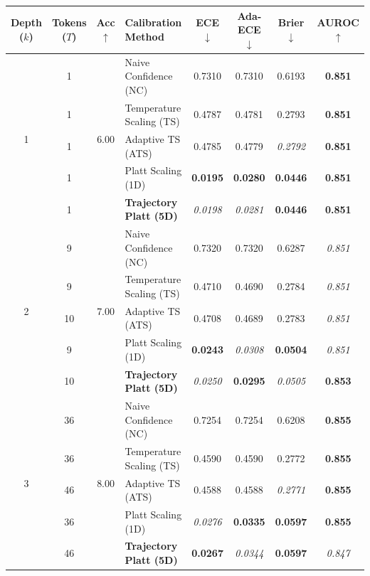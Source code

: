 \begin{table}[t]
\setlength{\tabcolsep}{4pt}
\renewcommand{\arraystretch}{1.05}
\centering
\footnotesize
\begin{tabular}{ccclcccc}
\toprule
\textbf{Depth ($k$)} & \textbf{Tokens ($T$)} & \textbf{Acc} $\uparrow$ & \textbf{Calibration Method} & \textbf{ECE} $\downarrow$ & \textbf{Ada-ECE} $\downarrow$ & \textbf{Brier} $\downarrow$ & \textbf{AUROC} $\uparrow$ \\
\midrule
\multirow{5}{*}{1} & 1 & \multirow{5}{*}{6.00} & Naive Confidence (NC) & 0.7310 & 0.7310 & 0.6193 & \textbf{0.851} \\
 & 1 &  & Temperature Scaling (TS) & 0.4787 & 0.4781 & 0.2793 & \textbf{0.851} \\
 & 1 &  & Adaptive TS (ATS) & 0.4785 & 0.4779 & \textit{0.2792} & \textbf{0.851} \\
 & 1 &  & Platt Scaling (1D) & \textbf{0.0195} & \textbf{0.0280} & \textbf{0.0446} & \textbf{0.851} \\
 & 1 &  & \textbf{Trajectory Platt (5D)} & \textit{0.0198} & \textit{0.0281} & \textbf{0.0446} & \textbf{0.851} \\
\midrule
\multirow{5}{*}{2} & 9 & \multirow{5}{*}{7.00} & Naive Confidence (NC) & 0.7320 & 0.7320 & 0.6287 & \textit{0.851} \\
 & 9 &  & Temperature Scaling (TS) & 0.4710 & 0.4690 & 0.2784 & \textit{0.851} \\
 & 10 &  & Adaptive TS (ATS) & 0.4708 & 0.4689 & 0.2783 & \textit{0.851} \\
 & 9 &  & Platt Scaling (1D) & \textbf{0.0243} & \textit{0.0308} & \textbf{0.0504} & \textit{0.851} \\
 & 10 &  & \textbf{Trajectory Platt (5D)} & \textit{0.0250} & \textbf{0.0295} & \textit{0.0505} & \textbf{0.853} \\
\midrule
\multirow{5}{*}{3} & 36 & \multirow{5}{*}{8.00} & Naive Confidence (NC) & 0.7254 & 0.7254 & 0.6208 & \textbf{0.855} \\
 & 36 &  & Temperature Scaling (TS) & 0.4590 & 0.4590 & 0.2772 & \textbf{0.855} \\
 & 46 &  & Adaptive TS (ATS) & 0.4588 & 0.4588 & \textit{0.2771} & \textbf{0.855} \\
 & 36 &  & Platt Scaling (1D) & \textit{0.0276} & \textbf{0.0335} & \textbf{0.0597} & \textbf{0.855} \\
 & 46 &  & \textbf{Trajectory Platt (5D)} & \textbf{0.0267} & \textit{0.0344} & \textbf{0.0597} & \textit{0.847} \\

\end{tabular}
\end{table}
